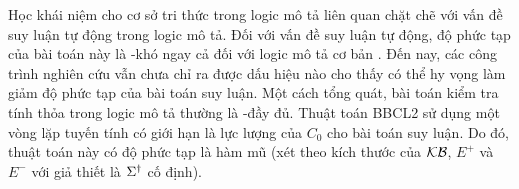 \begin{Remark}
Học khái niệm cho cơ sở tri thức trong logic mô tả liên quan chặt chẽ với vấn đề suy luận tự động trong logic mô tả. Đối với vấn đề suy luận tự động, độ phức tạp của bài toán này là \EXPTIME-khó ngay cả đối với logic mô tả cơ bản \ALC. Đến nay, các công trình nghiên cứu vẫn chưa chỉ ra được dấu hiệu nào cho thấy có thể hy vọng làm giảm độ phức tạp của bài toán suy luận. Một cách tổng quát, bài toán 
kiểm tra tính thỏa trong logic mô tả thường là \EXPTIME-đầy đủ.
Thuật toán BBCL2 sử dụng một vòng lặp tuyến tính có giới hạn là lực lượng của $C_0$ cho bài toán suy luận. Do đó, thuật toán này có độ phức tạp là hàm mũ (xét theo kích thước của $\mathcal{KB}$, $E^+$ và $E^-$ với giả thiết là $\Sigma^\dag$ cố định).
\end{Remark}

